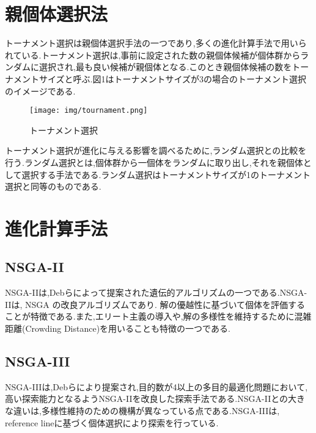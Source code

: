 \documentclass[a4paper,10pt]{jarticle}
\begin{document}
\vspace{-5mm}
\section{親個体選択法}
\vspace{-2mm}
トーナメント選択は親個体選択手法の一つであり,多くの進化計算手法で用いられている.トーナメント選択は,事前に設定された数の親個体候補が個体群からランダムに選択され,最も良い候補が親個体となる.このとき親個体候補の数をトーナメントサイズと呼ぶ\cite{katai}.図1はトーナメントサイズが3の場合のトーナメント選択のイメージである.
\vspace{-1.0mm}
\begin{wrapfigure}[10]{r}{65mm}
\vspace{-0.5mm}
\centering
\texttt{[image: img/tournament.png]}
\vspace{-0.5mm}
\caption{トーナメント選択}
\label{common}
\end{wrapfigure}

トーナメント選択が進化に与える影響を調べるために,ランダム選択との比較を行う.ランダム選択とは,個体群から一個体をランダムに取り出し,それを親個体として選択する手法である.ランダム選択はトーナメントサイズが1のトーナメント選択と同等のものである.
\vspace{-5mm}
\section{進化計算手法}
\vspace{-2mm}
\subsection{NSGA-II}
NSGA-II\cite{Deb}は,Debらによって提案された遺伝的アルゴリズムの一つである.NSGA-IIは, NSGA \cite{Srinivas}の改良アルゴリズムであり.
解の優越性に基づいて個体を評価することが特徴である.また,エリート主義の導入や,解の多様性を維持するために混雑距離(Crowding Distance)\cite{Deb}を用いることも特徴の一つである.
\vspace{-2mm}
\subsection{NSGA-III}
NSGA-III\cite{Jain}は,Debらにより提案され,目的数が4以上の多目的最適化問題において,高い探索能力となるようNSGA-IIを改良した探索手法である.NSGA-IIとの大きな違いは,多様性維持のための機構が異なっている点である.NSGA-IIIは, reference lineに基づく個体選択により探索を行っている.
\vspace{-2mm}
\end{document}
